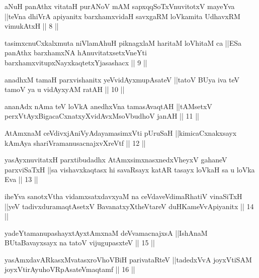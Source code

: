 
\begin{shl}
aNuH panAthx vitataH purANoV mAM sapxqqSoTxV\s nuvitotxV mayeYva ||teVna dhiVrA apiyanitx barxhamxvidaH savxgaRM loVkamita UdhavxRM vimukAtxH || 8 ||
\end{shl}

\begin{shl}
tasimxcnuCxkalxmuta niVlamAhuH piknagxlaM haritaM loVhitaM ca ||ESa panAthx barxhamxNA hAnuvitatxsetxVneYti barxhamxvitupxNayxkaqtetxYjasashacx || 9 ||
\end{shl}

\begin{shl}
anadhxM tamaH parxvishanitx yeV\s vidAyxmupAsateV ||tatoV BUya iva teV tamoV ya u vidAyxyAM ratAH || 10 ||
\end{shl}

\begin{shl}
ananAdx nAma teV loVkA anedhxVna tamasAvaqtAH ||tAMsetxV perxVtAyxBigacaCxnatxyXvidAvxMsoV\s budhoV janAH || 11 ||
\end{shl}

\begin{shl}
AtAmxnaM ceVdivxjAniVyAdayamasimxVti pUruSaH ||kimicaCxnakxsayx kAmAya shariVramanusacnajxvXreVtf || 12 ||
\end{shl}

\begin{shl}
yasAyxnuvitatxH parxtibudadhx AtAmxsimxnasxnedxVheyxV gahaneV parxviSaTxH ||sa vishavxkaqtasx hi savaRsayx katAR tasayx loVkaH sa u loVka Eva || 13 ||
\end{shl}

\begin{shl}
iheYva sanotxV\s tha vidamxsatxdavxyaM na ceVdaveVdimaRhatiV vinaSiTxH ||yeV tadivxduramaqtAsetxV BavanatxyXtheVtareV duHKameVvApiyanitx || 14 ||
\end{shl}

\begin{shl}
yadeYtamanupashayxtAyxtAmxnaM deVvamacnajxsA ||IshAnaM BUtaBavayxsayx na tatoV vijugupasxteV || 15 ||
\end{shl}

\begin{shl}
yasAmxdavARkasxMvatasxroV\s hoVBiH parivataRteV ||tadedxVvA joyxVtiSAM joyxVtirAyuhoVRpAsateV\s maqtamf || 16 ||
\end{shl}

